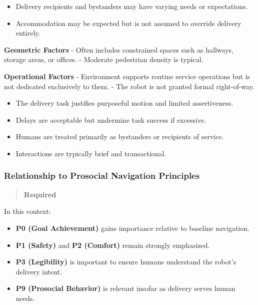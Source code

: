 \documentclass[utf8]{frontiers_suppmat} %
\providecommand{\tightlist}{%
  \setlength{\itemsep}{0pt}\setlength{\parskip}{0pt}}
\begin{document}
\label{diversity-context}

\begin{itemize}
\tightlist
\item
  Delivery recipients and bystanders may have varying needs or
  expectations.
\item
  Accommodation may be expected but is not assumed to override delivery
  entirely.
\end{itemize}

\label{environmental-context}

\textbf{Geometric Factors} - Often includes constrained spaces such as
hallways, storage areas, or offices. - Moderate pedestrian density is
typical.

\textbf{Operational Factors} - Environment supports routine service
operations but is not dedicated exclusively to them. - The robot is not
granted formal right-of-way.

\label{task-context}

\begin{itemize}
\tightlist
\item
  The delivery task justifies purposeful motion and limited
  assertiveness.
\item
  Delays are acceptable but undermine task success if excessive.
\end{itemize}

\label{interpersonal-context}

\begin{itemize}
\tightlist
\item
  Humans are treated primarily as bystanders or recipients of service.
\item
  Interactions are typically brief and transactional.
\end{itemize}

\subsubsection{Relationship to Prosocial Navigation
Principles}\label{relationship-to-prosocial-navigation-principles}

\begin{quote}
\textbf{Required}
\end{quote}

In this context:

\begin{itemize}
\tightlist
\item
  \textbf{P0 (Goal Achievement)} gains importance relative to baseline
  navigation.
\item
  \textbf{P1 (Safety)} and \textbf{P2 (Comfort)} remain strongly
  emphasized.
\item
  \textbf{P3 (Legibility)} is important to ensure humans understand the
  robot's delivery intent.
\item
  \textbf{P9 (Prosocial Behavior)} is relevant insofar as delivery
  serves human needs.
\end{itemize}
\end{document}
